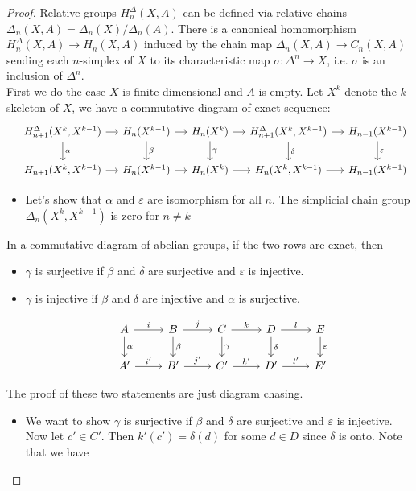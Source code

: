 \begin{proof}
Relative groups $H_n^{\Delta}(X,A)$ can be defined via relative chains $\Delta_n(X,A)=\Delta_n(X)/\Delta_n(A)$. There is a canonical homomorphism $H_n^{\Delta}(X,A)\to H_n(X,A)$ induced by the chain map $\Delta_n(X,A)\to C_n(X,A)$ sending each $n$-simplex of $X$ to its characteristic map $\sigma:\Delta^n\to X$, i.e. $\sigma$ is an inclusion of $\Delta^n$.\\ 
First we do the case $X$ is finite-dimensional and $A$ is empty. Let $X^k$ denote the $k$-skeleton of $X$, we have a commutative diagram of exact sequence:
\[\begin{tikzcd}[column sep=small]
&H_{n+1}^{\Delta}(X^k,X^{k-1}) \ar[r] \ar[d,"\alpha"] 
&H_n(X^{k-1}) \ar[r] \ar[d,"\beta"] 
&H_n(X^{k}) \ar[r] \ar[d,"\gamma"] 
&H_{n+1}^{\Delta}(X^k,X^{k-1}) \ar[r] \ar[d,"\delta"] 
&H_{n-1}(X^{k-1})  \ar[d,"\varepsilon"]\\
&H_{n+1}(X^k,X^{k-1}) \ar[r] 
&H_n(X^{k-1}) \ar[r] 
&H_n(X^k) \ar[r] 
&H_{n}(X^k,X^{k-1}) \ar[r] 
&H_{n-1}(X^{k-1})
\end{tikzcd}\]
\begin{itemize}
	\item Let's show that $\alpha$ and $\varepsilon$ are isomorphism for all $n$. The simplicial chain group $\Delta_n(X^k,X^{k-1})$ is zero for $n\neq k$
\end{itemize}
\begin{lemma}
In a commutative diagram of abelian groups, if the two rows are exact, then
\begin{itemize}
\item $\gamma$ is surjective if $\beta$ and $\delta$ are surjective and $\varepsilon$ is injective.
\item $\gamma$ is injective if $\beta$ and $\delta$ are injective and $\alpha$ is surjective.
\end{itemize}
\[
\begin{tikzcd}
&A \ar[r,"i"] \ar[d, "\alpha"] &B \ar[r,"j"] \ar[d, "\beta"] &C \ar[r,"k"] \ar[d, "\gamma"] &D \ar[r,"l"] \ar[d, "\delta"] &E  \ar[d, "\varepsilon"]\\
&A' \ar[r, "i'"] &B' \ar[r, "j'"] &C' \ar[r, "k'"] &D' \ar[r, "l'"] &E'
\end{tikzcd}
\]
\end{lemma}
The proof of these two statements are just diagram chasing. 
\begin{itemize}
\item We want to show $\gamma$ is surjective if $\beta$ and $\delta$ are surjective and $\varepsilon$ is injective. Now let $c'\in C'$. Then $k'(c')=\delta(d)$ for some $d\in D$ since $\delta$ is onto. Note that we have 

\end{itemize}
\end{proof}
